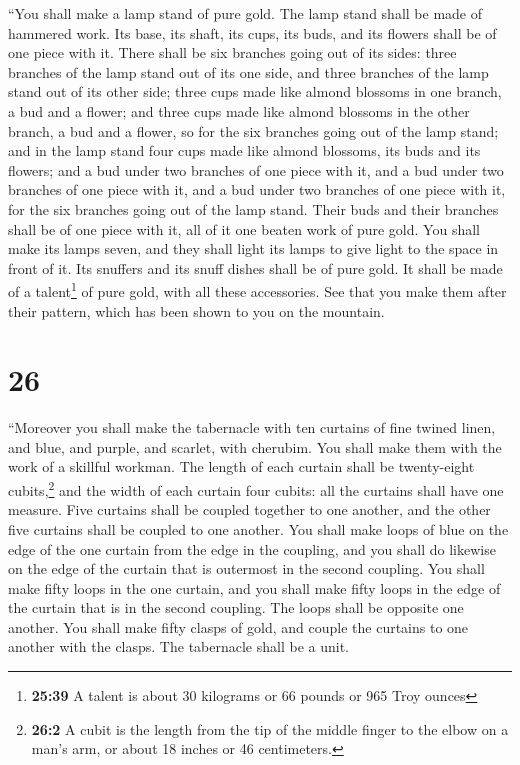  ``You shall make a lamp stand of pure gold. The lamp
stand shall be made of hammered work. Its base, its shaft, its cups, its
buds, and its flowers shall be of one piece with it. 
There shall be six branches going out of its sides: three branches of
the lamp stand out of its one side, and three branches of the lamp stand
out of its other side;  three cups made like almond
blossoms in one branch, a bud and a flower; and three cups made like
almond blossoms in the other branch, a bud and a flower, so for the six
branches going out of the lamp stand;  and in the lamp
stand four cups made like almond blossoms, its buds and its flowers;
 and a bud under two branches of one piece with it, and a
bud under two branches of one piece with it, and a bud under two
branches of one piece with it, for the six branches going out of the
lamp stand.  Their buds and their branches shall be of
one piece with it, all of it one beaten work of pure gold.
 You shall make its lamps seven, and they shall light its
lamps to give light to the space in front of it.  Its
snuffers and its snuff dishes shall be of pure gold.  It
shall be made of a talent\footnote{\textbf{25:39} A talent is about 30
  kilograms or 66 pounds or 965 Troy ounces} of pure gold, with all
these accessories.  See that you make them after their
pattern, which has been shown to you on the mountain.

\hypertarget{section-25}{%
\section{26}\label{section-25}}

 ``Moreover you shall make the tabernacle with ten
curtains of fine twined linen, and blue, and purple, and scarlet, with
cherubim. You shall make them with the work of a skillful workman.
 The length of each curtain shall be twenty-eight
cubits,\footnote{\textbf{26:2} A cubit is the length from the tip of the
  middle finger to the elbow on a man's arm, or about 18 inches or 46
  centimeters.} and the width of each curtain four cubits: all the
curtains shall have one measure.  Five curtains shall be
coupled together to one another, and the other five curtains shall be
coupled to one another.  You shall make loops of blue on
the edge of the one curtain from the edge in the coupling, and you shall
do likewise on the edge of the curtain that is outermost in the second
coupling.  You shall make fifty loops in the one curtain,
and you shall make fifty loops in the edge of the curtain that is in the
second coupling. The loops shall be opposite one another. 
You shall make fifty clasps of gold, and couple the curtains to one
another with the clasps. The tabernacle shall be a unit.

